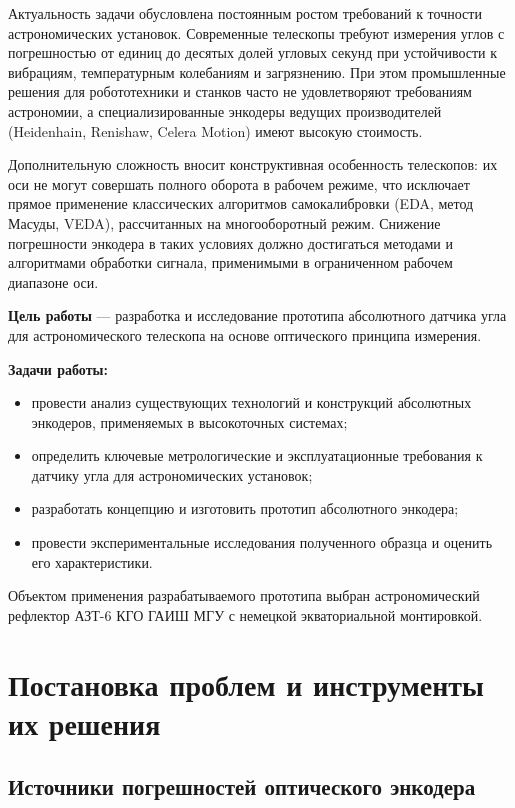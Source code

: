 Актуальность задачи обусловлена постоянным ростом требований к точности астрономических установок. Современные телескопы требуют измерения углов с погрешностью от единиц до десятых долей угловых секунд при устойчивости к вибрациям, температурным колебаниям и загрязнению. При этом промышленные решения для робототехники и станков часто не удовлетворяют требованиям астрономии, а специализированные энкодеры ведущих производителей (Heidenhain, Renishaw, Celera Motion) имеют высокую стоимость.

Дополнительную сложность вносит конструктивная особенность телескопов: их оси не могут совершать полного оборота в рабочем режиме, что исключает прямое применение классических алгоритмов самокалибровки (EDA, метод Масуды, VEDA), рассчитанных на многооборотный режим. Снижение погрешности энкодера в таких условиях должно достигаться  методами и алгоритмами обработки сигнала, применимыми в ограниченном рабочем диапазоне оси.

\textbf{Цель работы} --- разработка и исследование прототипа абсолютного датчика угла для астрономического телескопа на основе оптического принципа измерения.

\textbf{Задачи работы:}
\begin{itemize}
    \item провести анализ существующих технологий и конструкций абсолютных энкодеров, применяемых в высокоточных системах;
    \item определить ключевые метрологические и эксплуатационные требования к датчику угла для астрономических установок;
    \item разработать концепцию и изготовить прототип абсолютного энкодера;
    \item провести экспериментальные исследования полученного образца и оценить его характеристики.
\end{itemize}

Объектом применения разрабатываемого прототипа выбран астрономический рефлектор АЗТ-6 КГО ГАИШ МГУ с немецкой экваториальной монтировкой.

\section{Постановка проблем и инструменты их решения}

\subsection{Источники погрешностей оптического энкодера}

